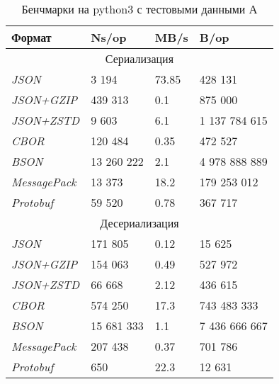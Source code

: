 \begin{table}[ht!]
\centering
\caption{Бенчмарки на python3 с тестовыми данными А}
\begin{tabular}{|l|l|l|l|} 
\hline
\textbf{Формат}      & \textbf{Ns/op} & \textbf{MB/s} & \textbf{B/op}  \\ 
\hline
\multicolumn{4}{|c|}{Сериализация}                                        \\ 
\hline
\textit{JSON}        & 3 194      &    73.85         &    428 131 \\ 
\hline
\textit{JSON+GZIP}   & 439 313       &     0.1          &    875 000 \\ 
\hline
\textit{JSON+ZSTD}   & 9 603        &    6.1           &    1 137 784 615 \\ 
\hline
\textit{CBOR}        & 120 484       &    0.35           &   472 527 \\ 
\hline
\textit{BSON}        & 13 260 222      &    2.1           &    4 978 888 889    \\ 
\hline
\textit{MessagePack} & 13 373        &     18.2          &   179 253 012 \\ 
\hline
\textit{Protobuf}    & 59 520        &     0.78          &   367 717 \\ 
\hline
\multicolumn{4}{|c|}{Десериализация}                                      \\ 
\hline
\textit{JSON}        & 171 805       &    0.12           &   15 625 \\ 
\hline
\textit{JSON+GZIP}   & 154 063       &    0.49           &   527 972 \\ 
\hline
\textit{JSON+ZSTD}   & 66 668       &     2.12          &   436 615 \\ 
\hline
\textit{CBOR}        & 574 250       &     17.3          &   743 483 333 \\ 
\hline
\textit{BSON}        & 15 681 333      &     1.1          &  7 436 666 667   \\ 
\hline
\textit{MessagePack} & 207 438       &     0.37          &   701 786 \\ 
\hline
\textit{Protobuf}    & 650         &     22.3           &   12 631 \\
\hline
\end{tabular}
\end{table}

